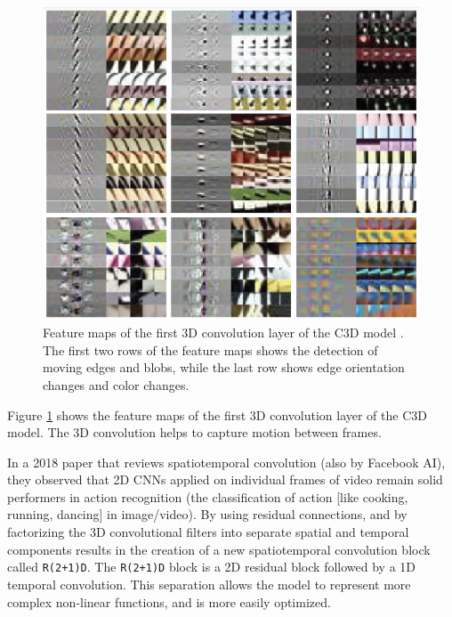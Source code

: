 \begin{figure}
    \centering
    \includegraphics[width=1\textwidth]{images/video_synthesis/c3d_feature_maps.png}
    \caption{Feature maps of the first 3D convolution layer of the C3D model \cite{tran2015learning}. The first two rows of the feature maps shows the detection of moving edges and blobs, while the last row shows edge orientation changes and color changes.}
    \label{fig:c3d_feature_maps}
\end{figure}

Figure \ref{fig:c3d_feature_maps} shows the feature maps of the first 3D convolution layer of the C3D model. The 3D convolution helps to capture motion between frames.

In a 2018 paper \cite{tran2018closer} that reviews spatiotemporal convolution (also by Facebook AI), they observed that 2D CNNs applied on individual frames of video remain solid performers in action recognition (the classification of action [like cooking, running, dancing] in image/video). By using residual connections, and by factorizing the 3D convolutional filters into separate spatial and temporal components results in the creation of a new spatiotemporal convolution block called \texttt{R(2+1)D}. The \texttt{R(2+1)D} block is a 2D residual block followed by a 1D temporal convolution. This separation allows the model to represent more complex non-linear functions, and is more easily optimized.